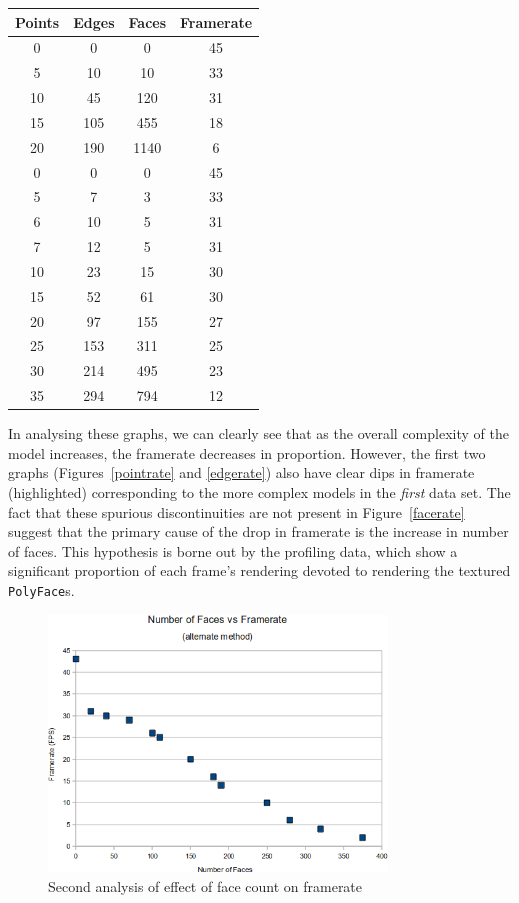 \documentclass[a4paper,10pt]{report}
\begin{document}
\begin{center}
\begin{tabular}{| c | c | c || c |} 
\hline
\textbf{Points}	& \textbf{Edges}	& \textbf{Faces}	& \textbf{Framerate} \\
\hline
\hline
0	& 0	& 0	& 45 \\
5	& 10	& 10	& 33 \\
10	& 45	& 120	& 31 \\
15	& 105	& 455	& 18 \\
20	& 190	& 1140	& 6 \\
\hline
\hline
0	& 0		& 0		& 45 \\
5	& 7		& 3		& 33 \\
6	& 10	& 5		& 31 \\
7	& 12	& 5		& 31 \\
10	& 23	& 15	& 30 \\
15	& 52	& 61	& 30 \\
20	& 97	& 155	& 27 \\
25	& 153	& 311	& 25 \\
30	& 214	& 495	& 23 \\
35	& 294	& 794	& 12 \\
\hline
\end{tabular}
\end{center} 

In analysing these graphs, we can clearly see that as the overall complexity of the model increases, the framerate decreases in proportion. However, the first two graphs (Figures~\ref{pointrate} and \ref{edgerate}) also have clear dips in framerate (highlighted) corresponding to the more complex models in the \textit{first} data set. The fact that these spurious discontinuities are not present in Figure~\ref{facerate} suggest that the primary cause of the drop in framerate is the increase in number of faces. This hypothesis is borne out by the profiling data, which show a significant proportion of each frame's rendering devoted to rendering the textured \texttt{PolyFace}s.

\begin{figure}
  \begin{center}
    \includegraphics[width=340px]{FacesVsFramerate2}
  \end{center}
  \caption{Second analysis of effect of face count on framerate}
  \label{facesrate2}
\end{figure}
\end{document}
